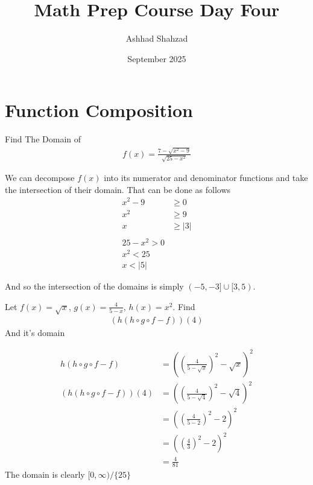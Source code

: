 \documentclass[a4paper]{article}
\title{Math Prep Course Day Four}
\author{Ashhad Shahzad}
\date{September 2025}
\begin{document}
\maketitle

\section{Function Composition}

\begin{question}{Find The Domain of}
\begin{align*}
f(x) = \frac{7 -\sqrt{x^2-9}}{\sqrt{25-x^2}}
\end{align*}
\end{question}

We can decompose \(f(x)\) into its numerator and denominator functions and take the intersection of their domain. That can be done as follows
\begin{align*}
x^2 - 9 &\geq 0 \\
x^2 &\geq 9 \\
x &\geq |3| \\ \\
25 - x^2 > 0 \\
x^2 < 25 \\
x < |5|
\end{align*}

And so the intersection of the domains is simply \((-5, -3] \cup [3, 5)\).


\begin{question}
Let \(f(x) = \sqrt{x}\), \(g(x) = \frac{4}{5-x}\), \(h(x) = x^2\). Find
\begin{align*}
(h(h \circ g\circ f - f))(4)
\end{align*}
And it's domain
\end{question}

\begin{align*}
h(h \circ g \circ f- f) &= \left(\left(\frac{4}{5-\sqrt{x}}\right)^2 -\sqrt{x}\right)^2 \\
(h(h \circ g\circ f -f))(4) &= \left(\left(\frac{4}{5-\sqrt{4}}\right)^2 - \sqrt{4}\right)^2 \\
    &= \left(\left(\frac{4}{5-2}\right)^2 - 2\right)^2 \\
    &= \left(\left(\frac{4}{3}\right)^2 - 2\right)^2 \\
    &= \frac{4}{81}
\end{align*}
The domain is clearly \([0, \infty)/\{25\}\)
\end{document}
